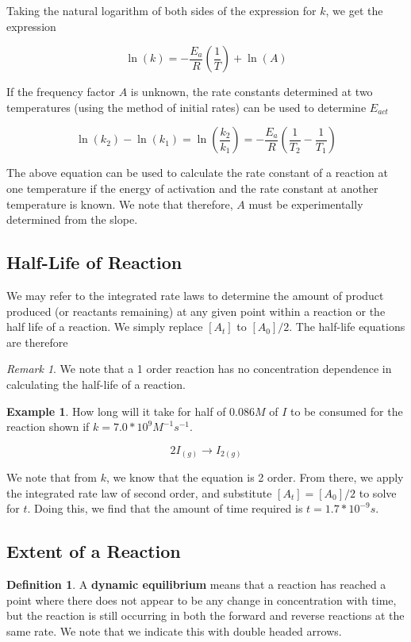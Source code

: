 \documentclass[11pt]{article}
\theoremstyle{plain} %
\theoremstyle{definition}
\newtheorem*{definition}{Definition} %
\theoremstyle{example}
\newtheorem*{example}{Example}
\theoremstyle{remark}
\newtheorem*{remark}{Remark}
\begin{document}
Taking the natural logarithm of both sides of the expression for $k$, we get the expression

$$\ln(k) = -\frac{E_a}{R}\left(\frac{1}{T}\right)+ \ln(A)$$

If the frequency factor $A$ is unknown, the rate constants determined at two temperatures (using the method of initial rates) can be used to determine $E_{act}$

$$\ln(k_2) - \ln(k_1) = \ln\left(\frac{k_2}{k_1}\right) = -\frac{E_a}{R}\left(\frac{1}{T_2} - \frac{1}{T_1}\right)$$

The above equation can be used to calculate the rate constant of a reaction at one temperature if the energy of activation and the rate constant at another temperature is known. We note that therefore, $A$ must be experimentally determined from the slope.  

\subsection{Half-Life of Reaction}

We may refer to the integrated rate laws to determine the amount of product produced (or reactants remaining) at any given point within a reaction or the half life of a reaction. We simply replace $[A_t]$ to $[A_0]/2$. The half-life equations are therefore

\begin{remark}
We note that a 1 order reaction has no concentration dependence in calculating the half-life of a reaction.  
\end{remark}

\begin{example}
How long will it take for half of $0.086 M$ of $I$ to be consumed for the reaction shown if $k=7.0*10^9M^{-1}s^{-1}$. 

$$2I_{(g)} \rightarrow I_{2(g)}$$
\end{example}

We note that from $k$, we know that the equation is 2 order. From there, we apply the integrated rate law of second order, and substitute $[A_t] = [A_0]/2$ to solve for $t$. Doing this, we find that the amount of time required is $t=1.7*10^{-9} s$. 

\subsection{Extent of a Reaction}

\begin{definition}
A \textbf{dynamic equilibrium} means that a reaction has reached a point where there does not appear to be any change in concentration with time, but the reaction is still occurring in both the forward and reverse reactions at the same rate. We note that we indicate this with double headed arrows. 
\end{definition}
\end{document}
